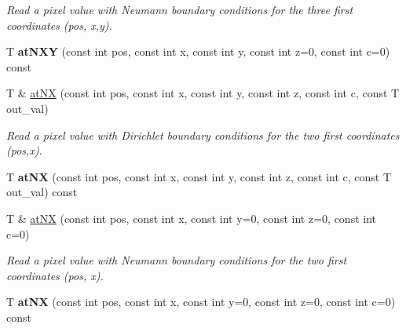 \begin{DoxyCompactItemize}
\begin{DoxyCompactList}\small\item\em Read a pixel value with Neumann boundary conditions for the three first coordinates ({\ttfamily pos}, {\ttfamily x},{\ttfamily y}). \item\end{DoxyCompactList}\item 
\hypertarget{structcimg__library_1_1CImgList_a2125232e0109d5e6e1df3541bf37f044}{
T {\bfseries atNXY} (const int pos, const int x, const int y, const int z=0, const int c=0) const }
\label{structcimg__library_1_1CImgList_a2125232e0109d5e6e1df3541bf37f044}

\item 
\hypertarget{structcimg__library_1_1CImgList_aaa23c11216a52dcaa1aac85807adffd5}{
T \& \hyperlink{structcimg__library_1_1CImgList_aaa23c11216a52dcaa1aac85807adffd5}{atNX} (const int pos, const int x, const int y, const int z, const int c, const T out\_\-val)}
\label{structcimg__library_1_1CImgList_aaa23c11216a52dcaa1aac85807adffd5}

\begin{DoxyCompactList}\small\item\em Read a pixel value with Dirichlet boundary conditions for the two first coordinates ({\ttfamily pos},{\ttfamily x}). \item\end{DoxyCompactList}\item 
\hypertarget{structcimg__library_1_1CImgList_a9bfbf470696ebe40a7ad98d8db3ad9c3}{
T {\bfseries atNX} (const int pos, const int x, const int y, const int z, const int c, const T out\_\-val) const }
\label{structcimg__library_1_1CImgList_a9bfbf470696ebe40a7ad98d8db3ad9c3}

\item 
\hypertarget{structcimg__library_1_1CImgList_a3a68a8ec0fd908a91d3a543e200c0a35}{
T \& \hyperlink{structcimg__library_1_1CImgList_a3a68a8ec0fd908a91d3a543e200c0a35}{atNX} (const int pos, const int x, const int y=0, const int z=0, const int c=0)}
\label{structcimg__library_1_1CImgList_a3a68a8ec0fd908a91d3a543e200c0a35}

\begin{DoxyCompactList}\small\item\em Read a pixel value with Neumann boundary conditions for the two first coordinates ({\ttfamily pos}, {\ttfamily x}). \item\end{DoxyCompactList}\item 
\hypertarget{structcimg__library_1_1CImgList_a4d54f779679588849052b67538bfc629}{
T {\bfseries atNX} (const int pos, const int x, const int y=0, const int z=0, const int c=0) const }
\label{structcimg__library_1_1CImgList_a4d54f779679588849052b67538bfc629}


\end{DoxyCompactItemize}

